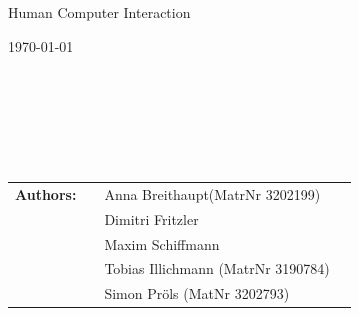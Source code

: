 \begin{center}
	\Large{Human Computer Interaction}
\end{center}
\begin{center}

\end{center}
\begin{center}
{\large \today\par}
\end{center}
\begin{verbatim}






\end{verbatim}
\begin{flushleft}
\begin{tabular}{llll}
\textbf{Authors:} & & Anna Breithaupt(MatrNr 3202199)\\  &&Dimitri Fritzler\\ &&Maxim Schiffmann\\ &&Tobias Illichmann (MatrNr 3190784)\\ &&Simon Pröls (MatNr 3202793)
\end{tabular}
\end{flushleft}



